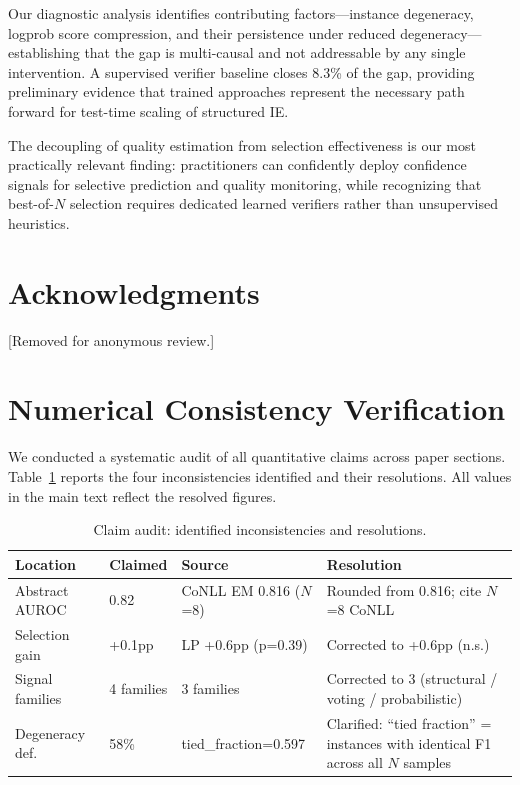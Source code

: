 \documentclass[11pt,a4paper]{article}
\begin{document}
Our diagnostic analysis identifies contributing factors---instance degeneracy, logprob score compression, and their persistence under reduced degeneracy---establishing that the gap is multi-causal and not addressable by any single intervention.
A supervised verifier baseline closes 8.3\% of the gap, providing preliminary evidence that trained approaches represent the necessary path forward for test-time scaling of structured IE.

The decoupling of quality estimation from selection effectiveness is our most practically relevant finding: practitioners can confidently deploy confidence signals for selective prediction and quality monitoring, while recognizing that best-of-$N$ selection requires dedicated learned verifiers rather than unsupervised heuristics.

\section*{Acknowledgments}
[Removed for anonymous review.]

\appendix

\section{Numerical Consistency Verification}
\label{app:audit}

We conducted a systematic audit of all quantitative claims across paper sections.
Table~\ref{tab:audit} reports the four inconsistencies identified and their resolutions.
All values in the main text reflect the resolved figures.

\begin{table}[h]
\centering
\small
\caption{Claim audit: identified inconsistencies and resolutions.}
\label{tab:audit}
\begin{tabular}{@{}p{3.2cm} p{1.8cm} p{2.5cm} p{3.5cm}@{}}
\toprule
Location & Claimed & Source & Resolution \\
\midrule
Abstract AUROC & 0.82 & CoNLL EM 0.816 ($N$=8) & Rounded from 0.816; cite $N$=8 CoNLL \\
Selection gain & +0.1pp & LP +0.6pp (p=0.39) & Corrected to +0.6pp (n.s.) \\
Signal families & 4 families & 3 families & Corrected to 3 (structural / voting / probabilistic) \\
Degeneracy def. & 58\% & tied\_fraction=0.597 & Clarified: ``tied fraction'' = instances with identical F1 across all $N$ samples \\
\bottomrule
\end{tabular}
\end{table}
\end{document}
